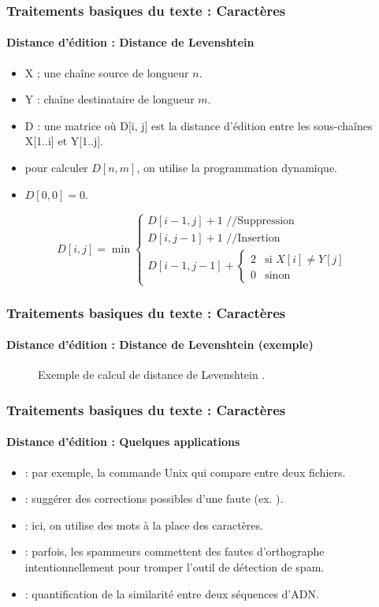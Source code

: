 \documentclass[xcolor=table]{beamer}
\begin{document}
\begin{frame}
\frametitle{Traitements basiques du texte : Caractères}
\framesubtitle{Distance d'édition : Distance de Levenshtein}

\begin{itemize}
	\item X ; une chaîne source de longueur $n$.
	\item Y : chaîne destinataire de longueur $m$.
	\item D : une matrice où D[i, j] est la distance d'édition entre les sous-chaînes X[1..i] et Y[1..j].
	\item pour calculer $D[n, m]$, on utilise la programmation dynamique.
	\item $D[0, 0] = 0$.
\end{itemize}

\[
D[i, j] = \min 
\begin{cases}
D[i - 1, j] + 1 \text{ //Suppression}\\
D[i, j-1] + 1 \text{ //Insertion}\\
D[i-1, j-1] + \begin{cases}
2 & \text{si } X[i] \ne Y[j] \\
0 & \text{sinon}
\end{cases}
\end{cases}
\]

\end{frame}

\begin{frame}
\frametitle{Traitements basiques du texte : Caractères}
\framesubtitle{Distance d'édition : Distance de Levenshtein (exemple)}

\begin{figure}
	\centering
	\caption{Exemple de calcul de distance de Levenshtein \cite{2019-jurafsky-martin}.}
\end{figure}

\end{frame}

\begin{frame}
\frametitle{Traitements basiques du texte : Caractères}
\framesubtitle{Distance d'édition : Quelques applications}

\begin{itemize}
	\item {} : par exemple, la commande Unix  qui compare entre deux fichiers.
	\item {} : suggérer des corrections possibles d'une faute (ex. ).
	\item {} : ici, on utilise des mots à la place des caractères.
	\item {} : parfois, les spammeurs commettent des fautes d'orthographe intentionnellement pour tromper l'outil de détection de spam.
	\item {} : quantification de la similarité entre deux séquences d'ADN.
\end{itemize}

\end{frame}
\end{document}
